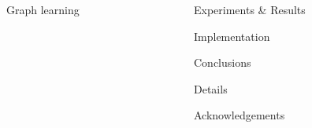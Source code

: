 \documentclass[final]{beamer}
\newlength{\sepwid}
\newlength{\twocolwid}
\begin{document}
\begin{frame}[t]
\begin{columns}[t]
\begin{column}{\twocolwid}
\begin{block}{Graph learning}
\end{block}


\end{column} %


\begin{column}{\sepwid}\end{column} %
\begin{column}{\twocolwid}

\begin{block}{Experiments \& Results}

\end{block}

\begin{block}{Implementation} %

\end{block}

\begin{block}{Conclusions} %

\end{block}

\begin{block}{Details}
	
\end{block}

\begin{block}{Acknowledgements}
	
\end{block}


\end{column}
\begin{column}{\sepwid}\end{column} %
\end{columns} %
\end{frame} %
\end{document}
